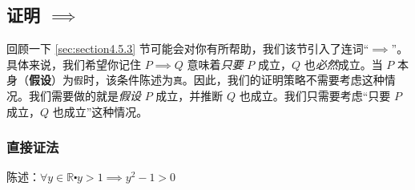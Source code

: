 

\subsection{证明 $\implies$}\label{sec:section4.9.5}

回顾一下 \ref{sec:section4.5.3} 节可能会对你有所帮助，我们该节引入了连词``$\implies$''。具体来说，我们希望你记住 $P \implies Q$ 意味着\emph{只要} $P$ 成立，$Q$ 也\emph{必然}成立。当 $P$ 本身（\textbf{假设}）为\verb|假|时，该条件陈述为\verb|真|。因此，我们的证明策略不需要考虑这种情况。我们需要做的就是\emph{假设} $P$ 成立，并推断 $Q$ 也成立。我们只需要考虑``只要 $P$ 成立，$Q$ 也成立''这种情况。

\subsubsection*{直接证法}

\begin{center}
    \noindent {}
\end{center}

\begin{example}[平方的单调性]

    陈述：$\forall y \in \mathbb{R} \centerdot y>1 \implies y^2-1>0$
\end{example}

\begin{center}
    \noindent {}
\end{center}


